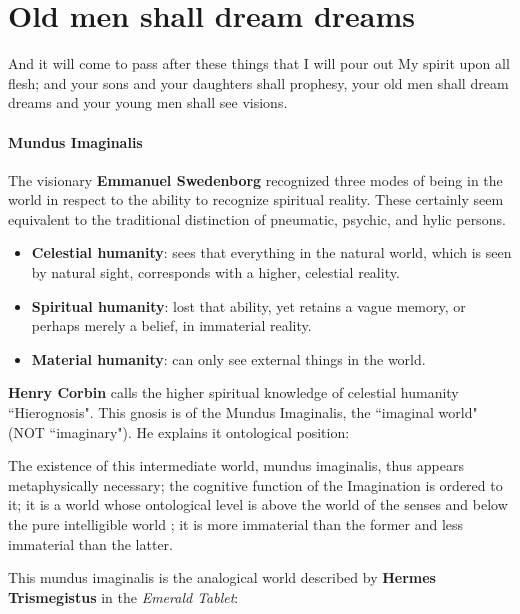 \section{Old men shall dream dreams}

\begin{quotex}
And it will come to pass after these things that I will pour out My spirit upon all flesh; and your sons and your daughters shall prophesy, your old men shall dream dreams and your young men shall see visions. 

\end{quotex}
\paragraph{Mundus Imaginalis}

The visionary \textbf{Emmanuel Swedenborg} recognized three modes of being in the world in respect to the ability to recognize spiritual reality. These certainly seem equivalent to the traditional distinction of pneumatic, psychic, and hylic persons.

\begin{itemize}
\item \textbf{Celestial humanity}: sees that everything in the natural world, which is seen by natural sight, corresponds with a higher, celestial reality. 
\item \textbf{Spiritual humanity}: lost that ability, yet retains a vague memory, or perhaps merely a belief, in immaterial reality. 
\item \textbf{Material humanity}: can only see external things in the world. 
\end{itemize}
\textbf{Henry Corbin} calls the higher spiritual knowledge of celestial humanity ``Hierognosis". This gnosis is of the Mundus Imaginalis, the ``imaginal world" (NOT ``imaginary"). He explains it ontological position:

\begin{quotex}
The existence of this intermediate world, mundus imaginalis, thus appears metaphysically necessary; the cognitive function of the Imagination is ordered to it; it is a world whose ontological level is above the world of the senses and below the pure intelligible world ; it is more immaterial than the former and less immaterial than the latter. 

\end{quotex}
This mundus imaginalis is the analogical world described by \textbf{Hermes Trismegistus} in the \emph{Emerald Tablet}:

